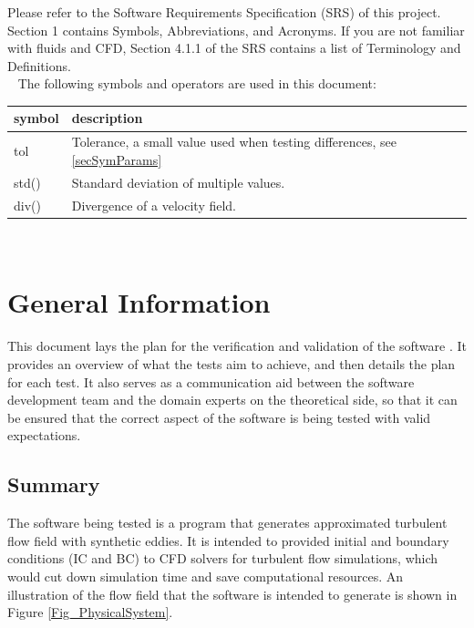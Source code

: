 \documentclass[12pt, titlepage]{article}
\begin{document}
Please refer to the Software Requirements Specification (SRS) \citet{SRS} of this project. Section 1 contains Symbols, Abbreviations, and Acronyms. If you are not familiar with fluids and CFD, Section 4.1.1 of the SRS contains a list of Terminology and Definitions.\\
~\newline
The following symbols and operators are used in this document:\\
\renewcommand{\arraystretch}{1.2}
\begin{tabular}{l l} 
  \toprule		
  \textbf{symbol} & \textbf{description}\\
  \midrule 
  tol & Tolerance, a small value used when testing differences, see \ref{secSymParams}\\
  std() & Standard deviation of multiple values.\\
  div() & Divergence of a velocity field.\\
  \bottomrule
\end{tabular}\\



\newpage


\section{General Information}

This document lays the plan for the verification and validation of the software \progname{}. It provides an overview of what the tests aim to achieve, and then details the plan for each test. It also serves as a communication aid between the software development team and the domain experts on the theoretical side, so that it can be ensured that the correct aspect of the software is being tested with valid expectations.

\subsection{Summary}

The software being tested is a program that generates approximated turbulent flow field with synthetic eddies. It is intended to provided initial and boundary conditions (IC and BC) to CFD solvers for turbulent flow simulations, which would cut down simulation time and save computational resources. An illustration of the flow field that the software is intended to generate is shown in Figure \ref{Fig_PhysicalSystem}.
\end{document}
